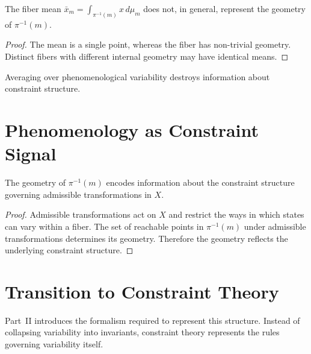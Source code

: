 \documentclass[11pt,openany]{book}
\begin{document}
\begin{proposition}
\label{prop:mean}
The fiber mean $\bar{x}_m = \int_{\pi^{-1}(m)} x \, d\mu_m$
does not, in general, represent the geometry of
$\pi^{-1}(m)$.
\end{proposition}

\begin{proof}
The mean is a single point, whereas the fiber has
non-trivial geometry. Distinct fibers with different
internal geometry may have identical means.
\end{proof}

\begin{corollary}
Averaging over phenomenological variability destroys
information about constraint structure.
\end{corollary}

\section{Phenomenology as Constraint Signal}
\label{sec:phenomenology-signal}

\begin{proposition}
\label{prop:constraint-encoding}
The geometry of $\pi^{-1}(m)$ encodes information about
the constraint structure governing admissible
transformations in $X$.
\end{proposition}

\begin{proof}
Admissible transformations act on $X$ and restrict the ways
in which states can vary within a fiber. The set of
reachable points in $\pi^{-1}(m)$ under admissible
transformations determines its geometry. Therefore the
geometry reflects the underlying constraint structure.
\end{proof}

\section{Transition to Constraint Theory}
\label{sec:transition-constraint}

Part~II introduces the formalism required to represent this
structure. Instead of collapsing variability into
invariants, constraint theory represents the rules
governing variability itself.



\end{document}
